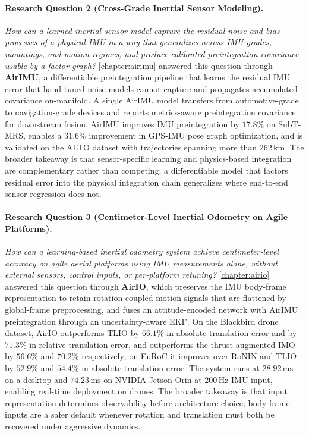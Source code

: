 \paragraph{Research Question 2 (Cross-Grade Inertial Sensor Modeling).}
\textit{How can a learned inertial sensor model capture the residual noise and bias processes of a physical IMU in a way that generalizes across IMU grades, mountings, and motion regimes, and produce calibrated preintegration covariance usable by a factor graph?}
\cref{chapter:airimu} answered this question through \textbf{AirIMU}, a differentiable preintegration pipeline that learns the residual IMU error that hand-tuned noise models cannot capture and propagates accumulated covariance on-manifold.
A single AirIMU model transfers from automotive-grade to navigation-grade devices and reports metrics-aware preintegration covariance for downstream fusion.
AirIMU improves IMU preintegration by $17.8\%$ on SubT-MRS, enables a $31.6\%$ improvement in GPS-IMU pose graph optimization, and is validated on the ALTO dataset with trajectories spanning more than $262\,\mathrm{km}$.
The broader takeaway is that sensor-specific learning and physics-based integration are complementary rather than competing; a differentiable model that factors residual error into the physical integration chain generalizes where end-to-end sensor regression does not.

\paragraph{Research Question 3 (Centimeter-Level Inertial Odometry on Agile Platforms).}
\textit{How can a learning-based inertial odometry system achieve centimeter-level accuracy on agile aerial platforms using IMU measurements alone, without external sensors, control inputs, or per-platform retuning?}
\cref{chapter:airio} answered this question through \textbf{AirIO}, which preserves the IMU body-frame representation to retain rotation-coupled motion signals that are flattened by global-frame preprocessing, and fuses an attitude-encoded network with AirIMU preintegration through an uncertainty-aware EKF.
On the Blackbird drone dataset, AirIO outperforms TLIO by $66.1\%$ in absolute translation error and by $71.3\%$ in relative translation error, and outperforms the thrust-augmented IMO by $56.6\%$ and $70.2\%$ respectively; on EuRoC it improves over RoNIN and TLIO by $52.9\%$ and $54.4\%$ in absolute translation error.
The system runs at $28.92\,\mathrm{ms}$ on a desktop and $74.23\,\mathrm{ms}$ on NVIDIA Jetson Orin at $200\,\mathrm{Hz}$ IMU input, enabling real-time deployment on drones.
The broader takeaway is that input representation determines observability before architecture choice; body-frame inputs are a safer default whenever rotation and translation must both be recovered under aggressive dynamics.

